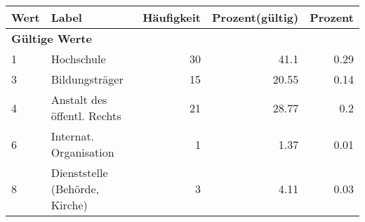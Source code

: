     \begin{longtable}{lXrrr}
     \toprule
     \textbf{Wert} & \textbf{Label} & \textbf{Häufigkeit} & \textbf{Prozent(gültig)} & \textbf{Prozent} \\
     \endhead
     \midrule
     \multicolumn{5}{l}{\textbf{Gültige Werte}}\\

     1 &
     \multicolumn{1}{X}{ Hochschule   } &


       \num{30} &
       \num[round-mode=places,round-precision=2]{41.1} &
         \num[round-mode=places,round-precision=2]{0.29} \\

     3 &
     \multicolumn{1}{X}{ Bildungsträger   } &


       \num{15} &
       \num[round-mode=places,round-precision=2]{20.55} &
         \num[round-mode=places,round-precision=2]{0.14} \\

     4 &
     \multicolumn{1}{X}{ Anstalt des öffentl. Rechts   } &


       \num{21} &
       \num[round-mode=places,round-precision=2]{28.77} &
         \num[round-mode=places,round-precision=2]{0.2} \\

     6 &
     \multicolumn{1}{X}{ Internat. Organisation   } &


       \num{1} &
       \num[round-mode=places,round-precision=2]{1.37} &
         \num[round-mode=places,round-precision=2]{0.01} \\

     8 &
     \multicolumn{1}{X}{ Dienststelle (Behörde, Kirche)   } &


       \num{3} &
       \num[round-mode=places,round-precision=2]{4.11} &
         \num[round-mode=places,round-precision=2]{0.03} \\


\end{longtable}
